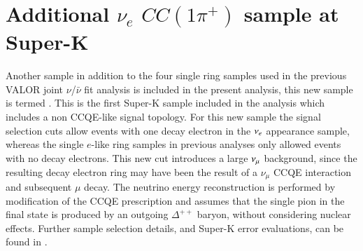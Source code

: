 \section{Additional $\nu_e$ $CC (1\pi^{+})$  sample at Super-K}
\label{sec:nuecconepi_sample}
Another sample in addition to the four single ring samples used in the previous VALOR joint \(\nu\)/\(\bar{\nu}\) fit analysis \cite{OurRun1617b17cJointAnalysis3Flavour} is included in the present analysis, this new sample is termed \nueCConepi{}. This is the first Super-K sample included in the analysis which includes a non CCQE-like signal topology. For this new sample the signal selection cuts allow events with one decay electron in the \(\nu_{e}\) appearance sample, whereas the single \(e\)-like ring samples in previous analyses only allowed events with no decay electrons. This new cut introduces a large \(\nu_{\mu}\) background, since the resulting decay electron ring may have been the result of a \(\nu_{\mu}\) CCQE interaction and subsequent \(\mu\) decay. The neutrino energy reconstruction is performed by modification of the CCQE prescription and assumes that the single pion in the final state is produced by an outgoing \(\Delta^{++}\) baryon, without considering nuclear effects. Further sample selection details, and Super-K error evaluations, can be found in \cite{InelSglPionNueDecayE}.

